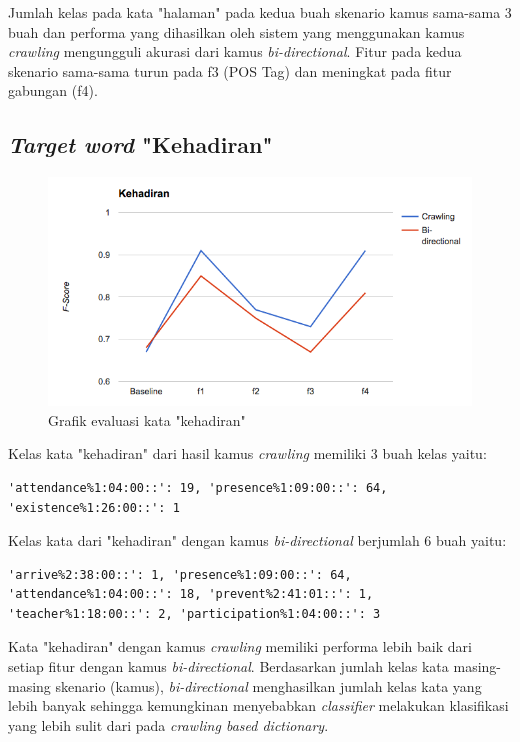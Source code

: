 Jumlah kelas pada kata "halaman" pada kedua buah skenario kamus sama-sama 3 buah dan performa yang dihasilkan oleh sistem yang menggunakan kamus \textit{crawling} mengungguli akurasi dari kamus \textit{bi-directional}. Fitur pada kedua skenario sama-sama turun pada f3 (POS Tag) dan meningkat pada fitur gabungan (f4).

\subsection{\textit{Target word} "Kehadiran"}

\begin{figure}
	\centering
	\includegraphics[width=1\linewidth]{adit_pics/kehadiran.png}
	\caption{Grafik evaluasi kata "kehadiran"}
	\label{fig:kehadiran}
\end{figure}

Kelas kata "kehadiran" dari hasil kamus \textit{crawling} memiliki 3 buah kelas yaitu:
\begin{lstlisting}
'attendance%1:04:00::': 19, 'presence%1:09:00::': 64, 'existence%1:26:00::': 1
\end{lstlisting}
Kelas kata dari "kehadiran" dengan kamus \textit{bi-directional} berjumlah 6 buah yaitu:
\begin{lstlisting}
'arrive%2:38:00::': 1, 'presence%1:09:00::': 64, 'attendance%1:04:00::': 18, 'prevent%2:41:01::': 1, 'teacher%1:18:00::': 2, 'participation%1:04:00::': 3
\end{lstlisting}

Kata "kehadiran" dengan kamus \textit{crawling} memiliki performa lebih baik dari setiap fitur dengan kamus \textit{bi-directional}. Berdasarkan jumlah kelas kata masing-masing skenario (kamus), \textit{bi-directional} menghasilkan jumlah kelas kata yang lebih banyak sehingga kemungkinan menyebabkan \textit{classifier} melakukan klasifikasi yang lebih sulit dari pada \textit{crawling based dictionary}.

